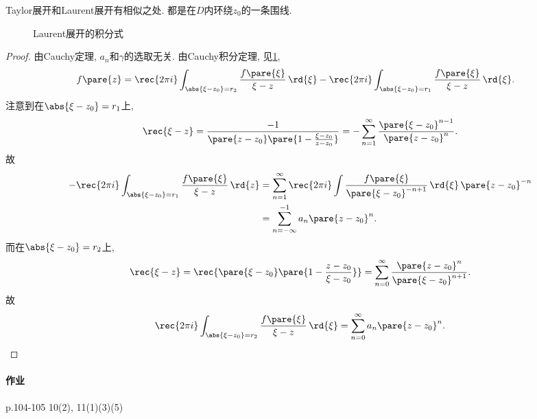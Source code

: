\documentclass[../ComplexVariable.tex]{subfiles}
\begin{document}
\begin{remark}
    Taylor展开和Laurent展开有相似之处. 都是在$D$内环绕$z_0$的一条围线.
\end{remark}
\begin{figure}[ht]
    \centering
    \caption{Laurent展开的积分式}
    \label{fig:Laurent展开的积分式}
\end{figure}
\begin{proof}
    由Cauchy定理, $a_n$和$\gamma$的选取无关. 由Cauchy积分定理, 见\cref{fig:Laurent展开的积分式},
    \begin{align*}
        f\pare{z} &= \rec{2\pi i} \int_{\abs{\xi - z_0} = r_2} \frac{f\pare{\xi}}{\xi - z}\,\rd{\xi} - \rec{2\pi i} \int_{\abs{\xi - z_0} = r_1} \frac{f\pare{\xi}}{\xi - z}\,\rd{\xi}.
    \end{align*}
    注意到在$\abs{\xi - z_0} = r_1$上,
    \[ \rec{\xi - z} = \frac{-1}{\pare{z-z_0}\pare{1-\frac{\xi - z_0}{z-z_0}}} = -\sum_{n=1}^\infty \frac{\pare{\xi - z_0}^{n-1}}{\pare{z-z_0}^n}.  \]
    故
    \begin{align*}
        -\rec{2\pi i} \int_{\abs{\xi - z_0} = r_1} \frac{f\pare{\xi}}{\xi - z}\,\rd{z} &= \sum_{n=1}^\infty \rec{2\pi i} \int \frac{f\pare{\xi}}{\pare{\xi - z_0}^{-n+1}} \,\rd{\xi}\,\pare{z-z_0}^{-n}\\ &= \sum_{n=-\infty}^{-1}a_n\pare{z-z_0}^n.
    \end{align*}
    而在$\abs{\xi - z_0} = r_2$上,
    \[ \rec{\xi - z} = \rec{\pare{\xi - z_0}\pare{1-\frac{z - z_0}{\xi - z_0}}} = \sum_{n=0}^\infty \frac{\pare{z-z_0}^n}{\pare{\xi - z_0}^{n+1}}. \]
    故
    \[ \rec{2\pi i}\int_{\abs{\xi - z_0} = r_2} \frac{f\pare{\xi}}{\xi - z}\,\rd{\xi} = \sum_{n=0}^\infty a_n\pare{z-z_0}^n. \qedhere \]
\end{proof}

\paragraph{作业} %
\label{par:作业}

p.104-105 10(2), 11(1)(3)(5)

\end{document}
